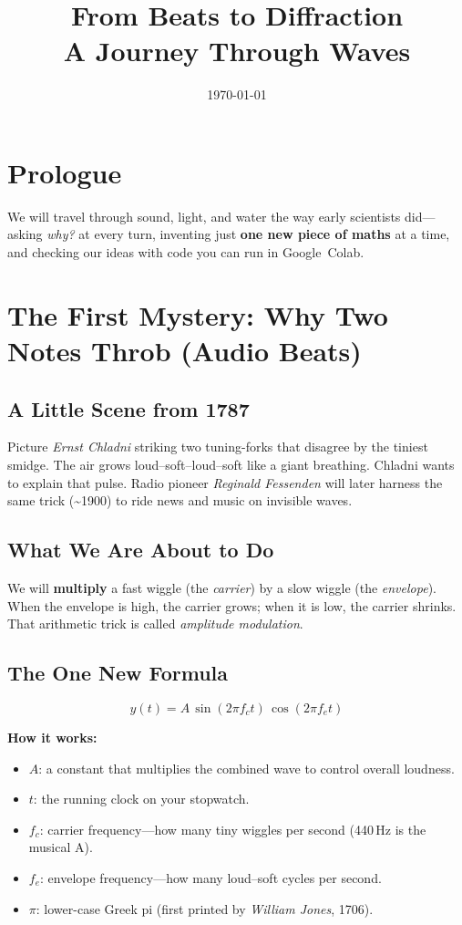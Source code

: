 \documentclass[12pt]{article}
\title{From Beats to Diffraction\\\large A Journey Through Waves}
\date{\today}
\begin{document}
\maketitle
\parindent 0pt
\parskip   6pt

\section*{Prologue}
We will travel through sound, light, and water the way early scientists did—asking \emph{why?} at every turn, inventing just \textbf{one new piece of maths} at a time, and checking our ideas with code you can run in Google~Colab.

\section{The First Mystery: Why Two Notes Throb (Audio Beats)}
\subsection*{A Little Scene from 1787}
Picture \textit{Ernst Chladni} striking two tuning-forks that disagree by the tiniest smidge. The air grows loud–soft–loud–soft like a giant breathing. Chladni wants to explain that pulse. Radio pioneer \textit{Reginald Fessenden} will later harness the same trick (\textasciitilde1900) to ride news and music on invisible waves.

\subsection*{What We Are About to Do}
We will \textbf{multiply} a fast wiggle (the \emph{carrier}) by a slow wiggle (the \emph{envelope}). When the envelope is high, the carrier grows; when it is low, the carrier shrinks. That arithmetic trick is called \emph{amplitude modulation}.

\subsection*{The One New Formula}
\begin{equation}
  y(t)=A\,\sin(2\pi f_{c}t)\,\cos(2\pi f_{e}t)
\end{equation}

\textbf{How it works:}
\begin{itemize}
  \item \(A\): a constant that multiplies the combined wave to control overall loudness.
  \item \(t\): the running clock on your stopwatch.
  \item \(f_{c}\): carrier frequency—how many tiny wiggles per second (440\,Hz is the musical A).
  \item \(f_{e}\): envelope frequency—how many loud–soft cycles per second.
  \item \(\pi\): lower-case Greek pi (first printed by \textit{William Jones}, 1706).
\end{itemize}
\end{document}
